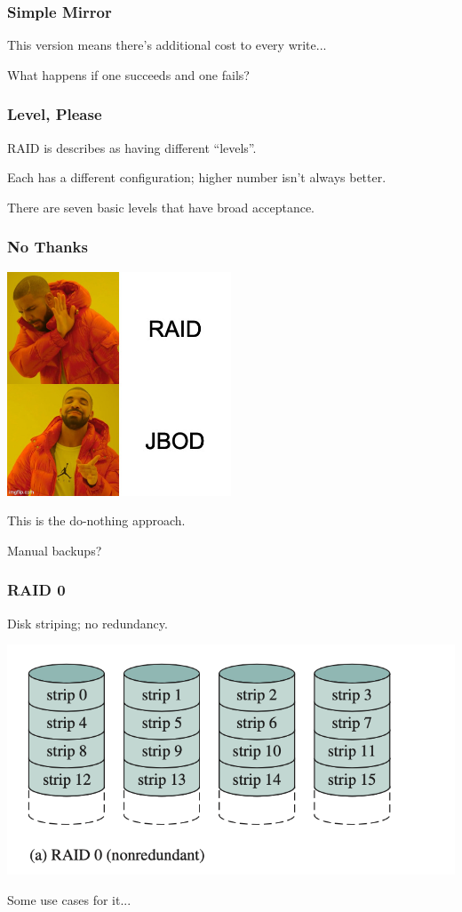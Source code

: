 \begin{frame}
\frametitle{Simple Mirror}

This version means there's additional cost to every write...

What happens if one succeeds and one fails?

\end{frame}


\begin{frame}
\frametitle{Level, Please}

RAID is describes as having different ``levels''.

Each has a different configuration; higher number isn't always better.

There are seven basic levels that have broad acceptance.

\end{frame}


\begin{frame}
\frametitle{No Thanks}

\begin{center}
	\includegraphics[width=0.5\textwidth]{images/jbod.jpg}
\end{center}

This is the do-nothing approach.

Manual backups? 

\end{frame}


\begin{frame}
\frametitle{RAID 0}

Disk striping; no redundancy.

\begin{center}
	\includegraphics[width=\textwidth]{images/raid0.png}
\end{center}

Some use cases for it...

\end{frame}


